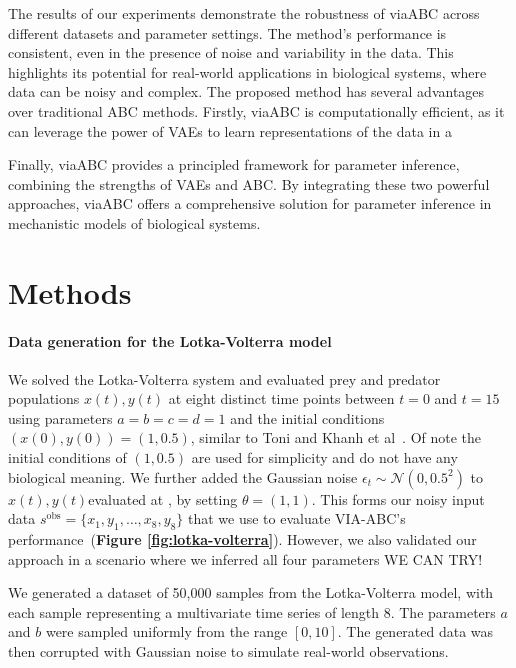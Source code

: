 \documentclass[12pt]{article} %
\newcommand{\para}[1]{\vspace*{-4.5mm}\paragraph{#1}}
\newcommand{\red}[1]{{\color{red}{#1}}}
\newcommand{\blue}[1]{{\color{magenta}{#1}}}
\begin{document}
The results of our experiments demonstrate the robustness of viaABC across different datasets and parameter settings. The method's performance is consistent, even in the presence of noise and variability in the data. This highlights its potential for real-world applications in biological systems, where data can be noisy and complex.
The proposed method has several advantages over traditional ABC methods. Firstly, viaABC is computationally efficient, as it can leverage the power of VAEs to learn representations of the data in a \blue{lower-dimensional space. This reduces the computational burden associated with simulating large datasets and allows for faster parameter inference. Secondly, viaABC is flexible and adaptable, making it suitable for a wide range of mechanistic models and biological systems. The method can be easily extended to incorporate additional features or modifications, allowing researchers to tailor it to their specific needs.}

Finally, viaABC provides a principled framework for parameter inference, combining the strengths of VAEs and ABC. By integrating these two powerful approaches, viaABC offers a comprehensive solution for parameter inference in mechanistic models of biological systems.


\section*{Methods}
\vspace{3mm}

\para{Data generation for the Lotka-Volterra model}

We solved the Lotka-Volterra system and evaluated prey and predator populations  $x(t), y(t)$ at eight distinct time points between \(t = 0\) and \(t = 15\) using parameters $a=b=c=d=1$  and the initial conditions \((x(0), y(0)) = (1, 0.5)\), similar to Toni and Khanh et al~\red{CITE}.
Of note the initial conditions of $(1, 0.5)$ are used for simplicity and do not have any biological meaning.
We further added the Gaussian noise \(\epsilon_t \sim \mathcal{N}(0, 0.5^2)\) to  $x(t), y(t)$evaluated at , by setting \(\theta = (1, 1)\).
This forms our noisy input data $s^{\mathrm{obs}} = \{x_1, y_1, \dots, x_8, y_8\}$ that we use to evaluate VIA-ABC's performance~(\textbf{Figure \ref{fig:lotka-volterra}}).
However, we also validated our approach in a scenario where we inferred all four parameters WE CAN TRY!

We generated a dataset of 50,000 samples from the Lotka-Volterra model, with each sample representing a multivariate time series of length 8.
The parameters \(a\) and \(b\) were sampled uniformly from the range \([0, 10]\).
The generated data was then corrupted with Gaussian noise to simulate real-world observations.
\end{document}
